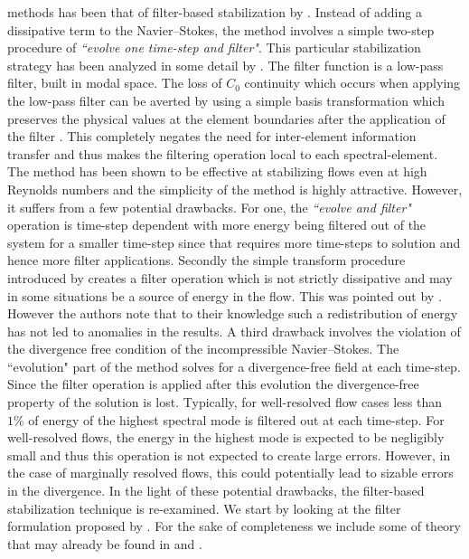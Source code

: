 methods has been that of filter-based stabilization by \cite{fischer01}. Instead of adding a dissipative term to the Navier--Stokes, the method involves a simple two-step procedure of \textit{``evolve one time-step and filter"}. This particular stabilization strategy has been analyzed in some detail by \cite{ervin12}. The filter function is a low-pass filter, built in modal space. The loss of $C_{0}$ continuity which occurs when applying the low-pass filter can be averted by using a simple basis transformation which preserves the physical values at the element boundaries after the application of the filter \citep{boyd98}. This completely negates the need for inter-element information transfer and thus makes the filtering operation local to each spectral-element. The method has been shown to be effective at stabilizing flows even at high Reynolds numbers and the simplicity of the method is highly attractive. However, it suffers from a few potential drawbacks. For one, the \textit{``evolve and filter"} operation is time-step dependent with more energy being filtered out of the system for a smaller time-step since that requires more time-steps to solution and hence more filter applications. Secondly the simple transform procedure introduced by \cite{boyd98} creates a filter operation which is not strictly dissipative and may in some situations be a source of energy in the flow. This was pointed out by \cite{pasquetti02}. However the authors note that to their knowledge such a redistribution of energy has not led to anomalies in the results. A third drawback involves the violation of the divergence free condition of the incompressible Navier--Stokes. The ``evolution" part of the method solves for a divergence-free field at each time-step. Since the filter operation is applied after this evolution the divergence-free property of the solution is lost. Typically, for well-resolved flow cases less than $1\%$ of energy of the highest spectral mode is filtered out at each time-step. For well-resolved flows, the energy in the highest mode is expected to be negligibly small and thus this operation is not expected to create large errors. However, in the case of marginally resolved flows, this could potentially lead to sizable errors in the divergence. In the light of these potential drawbacks, the filter-based stabilization technique is re-examined. We start by looking at the filter formulation proposed by \cite{boyd98}. For the sake of completeness we include some of theory that may already be found in \cite{boyd98} and \cite{pasquetti02}.

